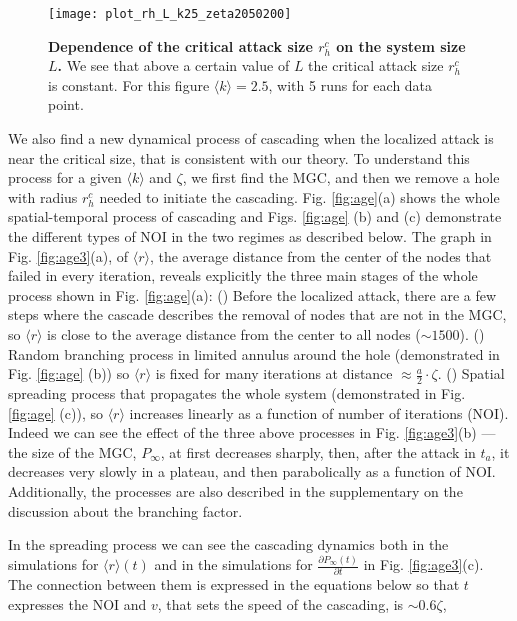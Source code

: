 \documentclass[twocolumn,noshowpacs,pre,preprintnumbers,superscriptaddress,amsmath,amssymb,floatfix]{revtex4}
\newcommand{\kk}{\langle k \rangle}
\begin{document}
	\begin{figure}
		\texttt{[image: plot\_rh\_L\_k25\_zeta2050200]}
		\caption{\textbf{Dependence of the critical attack size $r_h^c$ on the system size $L$.} 
			We see that above a certain value of $L$ the critical attack size $r_h^c$ is constant.
			For this figure $\kk = 2.5$, with 5 runs for each data point.}	
		\label{fig:rh_L}
	\end{figure}
	
	We also find a new dynamical process of cascading when the localized attack is near the critical size, that is consistent with our theory.
	To understand this process for a given $\kk$ and $\zeta$, we first find the MGC, and then we remove a hole with radius $r_h^c$ needed to initiate the cascading.
	Fig. \ref{fig:age}(a) shows the whole spatial-temporal process of cascading and Figs. \ref{fig:age} (b) and (c) demonstrate the different types of NOI in the two regimes as described below.
	The graph in Fig. \ref{fig:age3}(a), of $\langle r \rangle$, the average distance from the center of the nodes that failed in every iteration, reveals explicitly the three main stages of the whole process shown in Fig. \ref{fig:age}(a):
	() Before the localized attack, there are a few steps where the cascade describes the removal of nodes that are not in the MGC, so $\langle r \rangle$ is close to the average distance from the center to all nodes ($\sim 1500$).
	() Random branching process \cite{dong-pre2014,lee-pre2016} in limited annulus around the hole (demonstrated in Fig. \ref{fig:age} (b)) so $\langle r \rangle$ is fixed for many iterations at distance $\approx \frac{a}{2} \cdot \zeta$.
	() Spatial spreading process that propagates the whole system (demonstrated in Fig. \ref{fig:age} (c)), so $\langle r \rangle$ increases linearly as a function of number of iterations (NOI). %
	Indeed we can see the effect of the three above processes in Fig. \ref{fig:age3}(b) --- the size of the MGC, $P_\infty$, at first decreases sharply, then, after the attack in $t_a$, it decreases very slowly in a plateau, and then parabolically  as a function of NOI.
	Additionally, the processes are also described in the supplementary on the discussion about the branching factor.
	
	In the spreading process we can see the cascading dynamics both in the simulations for $\langle r \rangle(t)$ and in the simulations for $\frac{\partial P_\infty(t)}{\partial t}$ in Fig. \ref{fig:age3}(c). The connection between them is expressed in the equations below so that $t$ expresses the NOI and $v$, that sets the speed of the cascading, is $ \sim 0.6 \zeta$,
	
\end{document}
